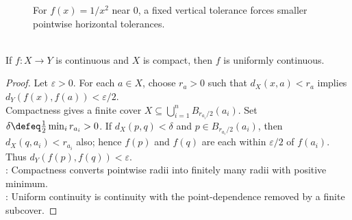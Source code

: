 \begin{figure}[H]
  \centering
  
  \caption{For $f(x)=1/x^2$ near $0$, a fixed vertical tolerance forces smaller pointwise horizontal tolerances.}
  \label{fig:uniform-continuity-delta-shrinks-one-over-x-squared}
\end{figure}

\begin{theorem} \label{thm:compact-continuity-uniform-continuity} \\
If $f:X\to Y$ is continuous and $X$ is compact, then $f$ is uniformly continuous.
\begin{proof}
Let $\varepsilon>0$. For each $a\in X$, choose $r_a>0$ such that $d_X(x,a)<r_a$ implies $d_Y(f(x),f(a))<\varepsilon/2$.\\
Compactness gives a finite cover $X\subseteq\bigcup_{i=1}^n B_{r_{a_i}/2}(a_i)$. Set $\delta\defeq\frac12\min_i r_{a_i}>0$. If $d_X(p,q)<\delta$ and $p\in B_{r_{a_i}/2}(a_i)$, then $d_X(q,a_i)<r_{a_i}$ also; hence $f(p)$ and $f(q)$ are each within $\varepsilon/2$ of $f(a_i)$. Thus $d_Y(f(p),f(q))<\varepsilon$.\\
: Compactness converts pointwise radii into finitely many radii with positive minimum.\\
: Uniform continuity is continuity with the point-dependence removed by a finite subcover.
\end{proof}
\end{theorem}


